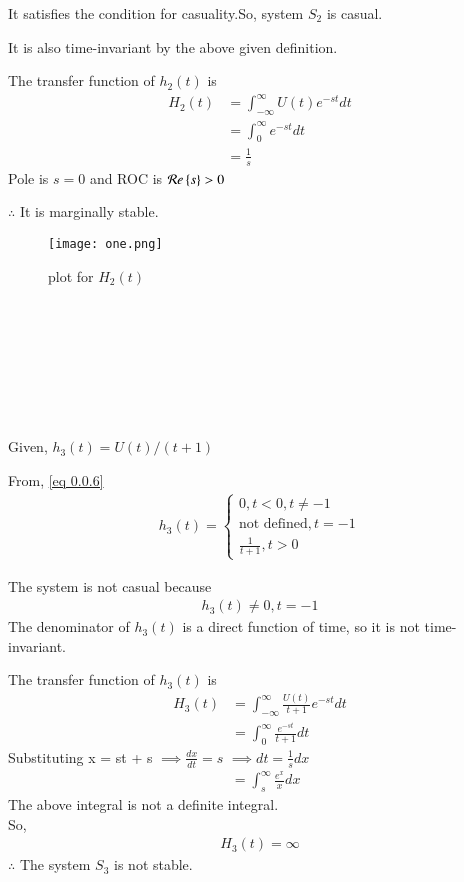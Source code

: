 \documentclass[journal,12pt,twocolumn]{IEEEtran}
\begin{document}
It satisfies the condition for casuality.So, system $S_2$ is casual.

It is also time-invariant by the above given definition.

The transfer function of $h_2(t)$ is
    \begin{align}
        H_2(t) &= \int_{-\infty}^{\infty} U(t)e^{-st} dt\\
        &= \int_{0}^{\infty} e^{-st} dt\\
        &= \frac{1}{s}
    \end{align}
Pole is $s = 0$ and ROC is $ \mathcal{R}e\left\{s\right\} > 0$

$\therefore$ It is marginally stable.
\begin{figure}[htp]
    \centering
    \texttt{[image: one.png]}
    \caption{plot for $H_2(t)$}
    \label{fig:my_label}
\end{figure}\\\\\\\\\\\\\\

Given, $h_3(t) = {U(t)}/{(t+1)}$

From, \eqref{eq 0.0.6}
\begin{align}
    h_3(t) = 
    \begin{cases}
    0, {t<0, t \neq -1}\\
    \text{not defined}, t = -1\\
    \frac{1}{t+1} , t > 0
    \end{cases}
\end{align}

The system is not casual because 
\begin{align}
h_3(t) \neq 0, t = -1
\end{align}
The denominator of $h_3(t)$ is a direct function of time, so it is not time-invariant.

The transfer function of $h_3(t)$ is
\begin{align}
    H_3(t) &= \int_{-\infty}^{\infty} \frac{U(t)}{t+1}e^{-st} dt\\
    &= \int_{0}^{\infty} \frac{e^{-st}}{t+1} dt
\end{align}
Substituting x = st + s 
$\implies \frac{dx}{dt} = s$ $\implies dt = \frac{1}{s}dx$
\begin{align}
    &= \int_{s}^{\infty} \frac{e^x}{x} dx
\end{align}
The above integral is not a definite integral. \\
So, 
\begin{align}
    H_3(t) = \infty
\end{align}
$\therefore$ The system $S_3$ is not stable.\\
\end{document}
